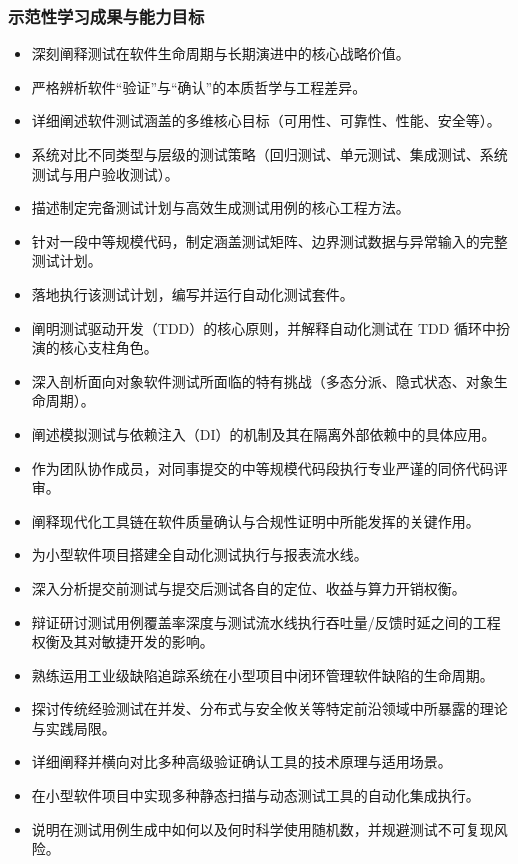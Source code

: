 \subsubsection{示范性学习成果与能力目标}
\begin{itemize}
    \item 深刻阐释测试在软件生命周期与长期演进中的核心战略价值。
    \item 严格辨析软件“验证”与“确认”的本质哲学与工程差异。
    \item 详细阐述软件测试涵盖的多维核心目标（可用性、可靠性、性能、安全等）。
    \item 系统对比不同类型与层级的测试策略（回归测试、单元测试、集成测试、系统测试与用户验收测试）。
    \item 描述制定完备测试计划与高效生成测试用例的核心工程方法。
    \item 针对一段中等规模代码，制定涵盖测试矩阵、边界测试数据与异常输入的完整测试计划。
    \item 落地执行该测试计划，编写并运行自动化测试套件。
    \item 阐明测试驱动开发（TDD）的核心原则，并解释自动化测试在 TDD 循环中扮演的核心支柱角色。
    \item 深入剖析面向对象软件测试所面临的特有挑战（多态分派、隐式状态、对象生命周期）。
    \item 阐述模拟测试与依赖注入（DI）的机制及其在隔离外部依赖中的具体应用。
    \item 作为团队协作成员，对同事提交的中等规模代码段执行专业严谨的同侪代码评审。
    \item 阐释现代化工具链在软件质量确认与合规性证明中所能发挥的关键作用。
    \item 为小型软件项目搭建全自动化测试执行与报表流水线。
    \item 深入分析提交前测试与提交后测试各自的定位、收益与算力开销权衡。
    \item 辩证研讨测试用例覆盖率深度与测试流水线执行吞吐量/反馈时延之间的工程权衡及其对敏捷开发的影响。
    \item 熟练运用工业级缺陷追踪系统在小型项目中闭环管理软件缺陷的生命周期。
    \item 探讨传统经验测试在并发、分布式与安全攸关等特定前沿领域中所暴露的理论与实践局限。
    \item 详细阐释并横向对比多种高级验证确认工具的技术原理与适用场景。
    \item 在小型软件项目中实现多种静态扫描与动态测试工具的自动化集成执行。
    \item 说明在测试用例生成中如何以及何时科学使用随机数，并规避测试不可复现风险。

\end{itemize}
